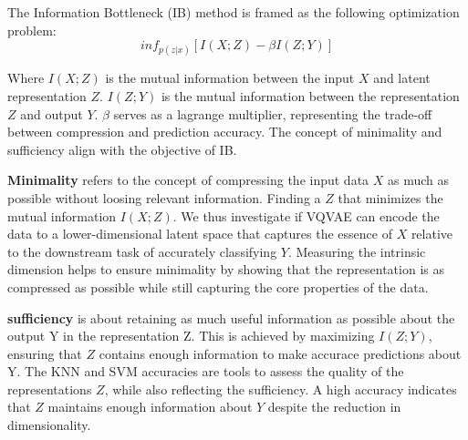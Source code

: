 The Information Bottleneck (IB) method is framed as the following optimization problem:
$$ inf_{p(z|x)} \left[ I(X;Z)-\beta I(Z;Y) \right] $$

Where $I(X;Z)$ is the mutual information between the input $X$ and latent representation $Z$. $I(Z;Y)$ is the mutual information between the representation $Z$ and output $Y$. $\beta$ serves as a lagrange multiplier, representing the trade-off between
compression and prediction accuracy. The concept of minimality and sufficiency align with the objective of IB.

\textbf{Minimality} refers to the concept of compressing the input data $X$ as much as possible without loosing relevant information. Finding a $Z$ that minimizes the mutual information $I(X;Z)$. We thus investigate if VQVAE can encode the data to a lower-dimensional
latent space that captures the essence of $X$ relative to the downstream task of accurately classifying $Y$. Measuring the intrinsic dimension helps to ensure minimality by showing that the representation is as compressed as possible while still capturing the core properties of the data.

\textbf{sufficiency} is about retaining as much useful information as possible about the output Y in the representation Z. This is achieved by maximizing $I(Z;Y)$, ensuring that $Z$ contains enough information to make accurace predictions about Y.
The KNN and SVM accuracies are tools to assess the quality of the representations $Z$, while also reflecting the sufficiency. A high accuracy indicates that $Z$ maintains enough information about $Y$ despite the reduction in dimensionality.
